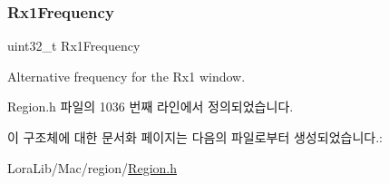 \mbox{\label{structs_dl_channel_req_params_a8a564b8635b12d5f0f348ae177dd92e1}} 
\subsubsection{\texorpdfstring{Rx1\+Frequency}{Rx1Frequency}}
{\footnotesize\ttfamily uint32\+\_\+t Rx1\+Frequency}

Alternative frequency for the Rx1 window. 

Region.\+h 파일의 1036 번째 라인에서 정의되었습니다.



이 구조체에 대한 문서화 페이지는 다음의 파일로부터 생성되었습니다.\+:\begin{DoxyCompactItemize}
\item 
Lora\+Lib/\+Mac/region/\mbox{\hyperlink{_region_8h}{Region.\+h}}\end{DoxyCompactItemize}
